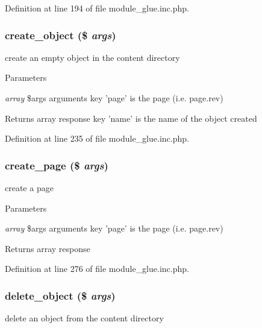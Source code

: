 Definition at line 194 of file module\_\-glue.inc.php.

\hypertarget{module__glue_8inc_8php_a12aa18f28f86274d770ba90aa88e2c3e}{
\subsubsection[{create\_\-object}]{\setlength{\rightskip}{0pt plus 5cm}create\_\-object (\$ {\em args})}}
\label{module__glue_8inc_8php_a12aa18f28f86274d770ba90aa88e2c3e}
create an empty object in the content directory


\begin{DoxyParams}{Parameters}
\item[{\em array}]\$args arguments key 'page' is the page (i.e. page.rev) \end{DoxyParams}
\begin{DoxyReturn}{Returns}
array response key 'name' is the name of the object created 
\end{DoxyReturn}


Definition at line 235 of file module\_\-glue.inc.php.

\hypertarget{module__glue_8inc_8php_a9806cd2a9b829a24876b149753e819fb}{
\subsubsection[{create\_\-page}]{\setlength{\rightskip}{0pt plus 5cm}create\_\-page (\$ {\em args})}}
\label{module__glue_8inc_8php_a9806cd2a9b829a24876b149753e819fb}
create a page


\begin{DoxyParams}{Parameters}
\item[{\em array}]\$args arguments key 'page' is the page (i.e. page.rev) \end{DoxyParams}
\begin{DoxyReturn}{Returns}
array response 
\end{DoxyReturn}


Definition at line 276 of file module\_\-glue.inc.php.

\hypertarget{module__glue_8inc_8php_a51fdb1d1ff829d6d2d79a9f852b7e0ef}{
\subsubsection[{delete\_\-object}]{\setlength{\rightskip}{0pt plus 5cm}delete\_\-object (\$ {\em args})}}
\label{module__glue_8inc_8php_a51fdb1d1ff829d6d2d79a9f852b7e0ef}
delete an object from the content directory



